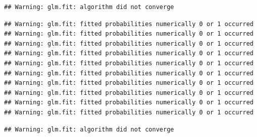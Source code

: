 \documentclass[
]{article}
\begin{document}
\begin{verbatim}
## Warning: glm.fit: algorithm did not converge
\end{verbatim}

\begin{verbatim}
## Warning: glm.fit: fitted probabilities numerically 0 or 1 occurred
## Warning: glm.fit: fitted probabilities numerically 0 or 1 occurred
## Warning: glm.fit: fitted probabilities numerically 0 or 1 occurred
## Warning: glm.fit: fitted probabilities numerically 0 or 1 occurred
## Warning: glm.fit: fitted probabilities numerically 0 or 1 occurred
## Warning: glm.fit: fitted probabilities numerically 0 or 1 occurred
## Warning: glm.fit: fitted probabilities numerically 0 or 1 occurred
## Warning: glm.fit: fitted probabilities numerically 0 or 1 occurred
## Warning: glm.fit: fitted probabilities numerically 0 or 1 occurred
## Warning: glm.fit: fitted probabilities numerically 0 or 1 occurred
\end{verbatim}

\begin{verbatim}
## Warning: glm.fit: algorithm did not converge
\end{verbatim}
\end{document}
